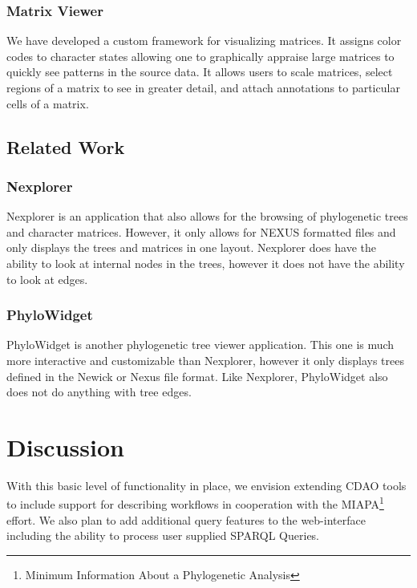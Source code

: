 \documentclass[10pt]{bmc_article}
\newenvironment{bmcformat}{\begin{raggedright}\baselineskip20pt\sloppy\setboolean{publ}{false}}{\end{raggedright}\baselineskip20pt\sloppy}
\begin{document}
\begin{bmcformat}
\subsubsection*{Matrix Viewer} We have developed  a custom
framework for visualizing matrices. It assigns color codes to character states
allowing one to graphically appraise large matrices to quickly see patterns in
the source data. It allows users to scale matrices, select regions of a matrix
to see in greater detail, and attach annotations to particular cells of a
matrix. 
  
\subsection*{Related Work}
\subsubsection*{Nexplorer}
Nexplorer is an application that also allows for the browsing of phylogenetic
trees and character matrices.  However, it only allows for NEXUS formatted
files and only displays the trees and matrices in one layout.  Nexplorer does
have the ability to look at internal nodes in the trees, however it does not
have the ability to look at edges.  \subsubsection*{PhyloWidget} PhyloWidget is
another phylogenetic tree viewer application.  This one is much more
interactive and customizable than Nexplorer, however it only displays trees
defined in the Newick or Nexus file format.  Like Nexplorer, PhyloWidget also
does not do anything with tree edges.

\section*{Discussion}

  With this basic level of functionality in place, we envision extending CDAO tools to include support for describing
  workflows in cooperation with the MIAPA\footnote{Minimum Information About a Phylogenetic Analysis} effort.
  We also plan to add additional query features to the web-interface including the ability to process user supplied
  SPARQL Queries.
  

\end{bmcformat}
\end{document}
